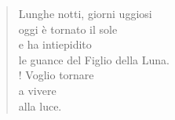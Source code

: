 
\begin{verse}
Lunghe notti, giorni uggiosi\\
oggi è tornato il sole\\
e ha intiepidito\\
le guance del Figlio della Luna.\\!
Voglio tornare\\
a vivere\\
alla luce.
\end{verse}